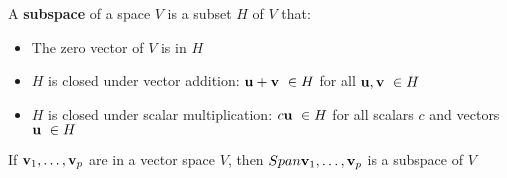\documentclass{report}
\begin{document}
\begin{definition}
    A \textbf{subspace} of a space $V$ is a subset $H$ of $V$ that:
    \begin{itemize}
        \item The zero vector of $V$ is in $H$
        \item $H$ is closed under vector addition: $\uu + \vv \ \in H$ for all $\mathbf{u}, \mathbf{v} \ \in H$
        \item $H$ is closed under scalar multiplication: $c\uu \ \in H$ for all scalars $c$ and vectors $\mathbf{u}\ \in H$
    \end{itemize}
\end{definition}

\begin{theorem}
    If $\mathbf{v}_1, \ldots, \mathbf{v}_p$ are in a vector space $V$, then $Span {\mathbf{v}_1, \ldots, \mathbf{v}_p}$ is a subspace of $V$
\end{theorem}
\end{document}
